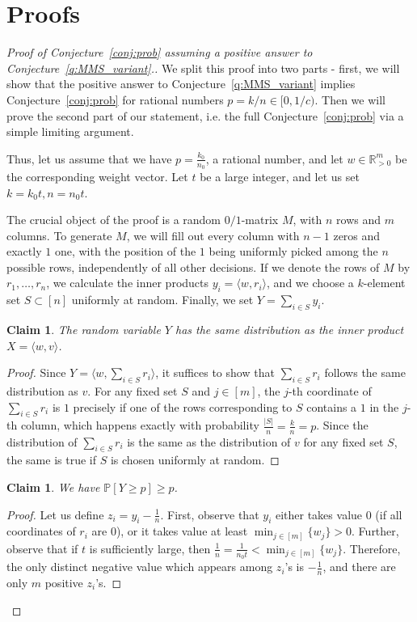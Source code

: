 \documentclass[11pt]{amsart}
\newtheorem{claim}[theorem]{\bf Claim}
\theoremstyle{definition}
\newenvironment{claimproof}{%
  \renewcommand{\qedsymbol}{$\boxdot$}%
  \begin{proof}%
}{%
  \end{proof}%
  \renewcommand{\qedsymbol}{$\square$}%
}
\def\bR{\mathbb{R}}
\def\Pb{\mathbb{P}}
\begin{document}
\section{Proofs}

\begin{proof}[Proof of Conjecture~\ref{conj:prob} assuming a positive answer to Conjecture~\ref{q:MMS_variant}.]
We split this proof into two parts - first, we will show that the positive answer to Conjecture~\ref{q:MMS_variant} implies Conjecture~\ref{conj:prob} for rational numbers $p=k/n\in [0, 1/c)$. Then we will prove the second part of our statement, i.e. the full Conjecture~\ref{conj:prob} via a simple limiting argument.


Thus, let us assume that we have $p=\frac{k_0}{n_0}$, a rational number, and let $w\in \bR_{>0}^m$ be the corresponding weight vector. Let $t$ be a large integer, and let us set $k=k_0t, n=n_0t$.

The crucial object of the proof is a random $0/1$-matrix $M$, with $n$ rows and $m$ columns. To generate $M$, we will fill out every column with $n-1$ zeros and exactly $1$ one, with the position of the $1$ being uniformly picked among the $n$ possible rows, independently of all other decisions. If we denote the rows of $M$ by $r_1, \dots, r_n$, we calculate the inner products $y_i=\langle w, r_i\rangle$, and we choose a $k$-element set $S\subset [n]$ uniformly at random. Finally, we set $Y=\sum_{i\in S}y_i$. 

\begin{claim}
The random variable $Y$ has the same distribution as the inner product $X=\langle w, v\rangle$.
\end{claim}
\begin{claimproof}
Since $Y=\langle w, \sum_{i\in S}r_i\rangle$, it suffices to show that $\sum_{i\in S}r_i$ follows the same distribution as $v$. For any fixed set $S$ and $j\in [m]$, the $j$-th coordinate of $\sum_{i\in S}r_i$ is $1$ precisely if one of the rows corresponding to $S$ contains a $1$ in the $j$-th column, which happens exactly with probability $\frac{|S|}{n}=\frac{k}{n}=p$. Since the distribution of $\sum_{i\in S}r_i$ is the same as the distribution of $v$ for any fixed set $S$, the same is true if $S$ is chosen uniformly at random.
\end{claimproof}

\begin{claim}
We have $\Pb[Y\geq p]\geq p$.
\end{claim}
\begin{claimproof}
Let us define $z_i=y_i-\frac{1}{n}$. First, observe that $y_i$ either takes value $0$ (if all coordinates of $r_i$ are $0$), or it takes value at least $\min_{j\in [m]}\{w_j\}>0$. Further, observe that if $t$ is sufficiently large, then $\frac{1}{n}=\frac{1}{n_0t}<\min_{j\in [m]}\{w_j\}$. Therefore, the only distinct negative value which appears among $z_i$'s is $-\frac{1}{n}$, and there are only $m$ positive $z_i$'s.


\end{claimproof}
\end{proof}
\end{document}
